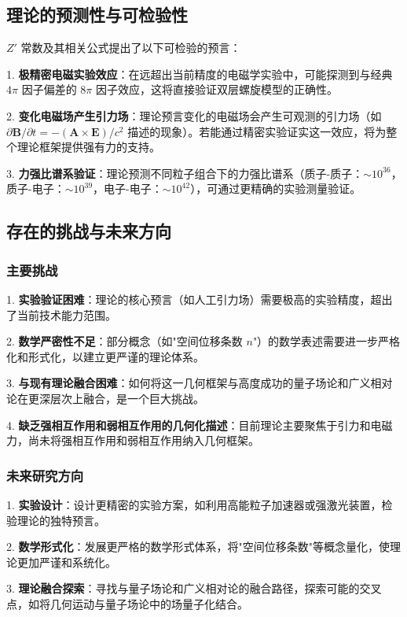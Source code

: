 \documentclass[a4paper,12pt]{article}
\theoremstyle{plain}
\renewcommand{\vec}[1]{\bm{#1}}
\begin{document}
\subsection{理论的预测性与可检验性}

$Z'$ 常数及其相关公式提出了以下可检验的预言：

1. \textbf{极精密电磁实验效应}：在远超出当前精度的电磁学实验中，可能探测到与经典 $4\pi$ 因子偏差的 $8\pi$ 因子效应，这将直接验证双层螺旋模型的正确性。

2. \textbf{变化电磁场产生引力场}：理论预言变化的电磁场会产生可观测的引力场（如 $\partial\vec{B}/\partial t = - (\vec{A} \times \vec{E})/c^2$ 描述的现象）。若能通过精密实验证实这一效应，将为整个理论框架提供强有力的支持。

3. \textbf{力强比谱系验证}：理论预测不同粒子组合下的力强比谱系（质子-质子：$\sim10^{36}$，质子-电子：$\sim10^{39}$，电子-电子：$\sim10^{42}$），可通过更精确的实验测量验证。

\subsection{存在的挑战与未来方向}

\subsubsection{主要挑战}

1. \textbf{实验验证困难}：理论的核心预言（如人工引力场）需要极高的实验精度，超出了当前技术能力范围。

2. \textbf{数学严密性不足}：部分概念（如"空间位移条数 $n$"）的数学表述需要进一步严格化和形式化，以建立更严谨的理论体系。

3. \textbf{与现有理论融合困难}：如何将这一几何框架与高度成功的量子场论和广义相对论在更深层次上融合，是一个巨大挑战。

4. \textbf{缺乏强相互作用和弱相互作用的几何化描述}：目前理论主要聚焦于引力和电磁力，尚未将强相互作用和弱相互作用纳入几何框架。

\subsubsection{未来研究方向}

1. \textbf{实验设计}：设计更精密的实验方案，如利用高能粒子加速器或强激光装置，检验理论的独特预言。

2. \textbf{数学形式化}：发展更严格的数学形式体系，将"空间位移条数"等概念量化，使理论更加严谨和系统化。

3. \textbf{理论融合探索}：寻找与量子场论和广义相对论的融合路径，探索可能的交叉点，如将几何运动与量子场论中的场量子化结合。
\end{document}
